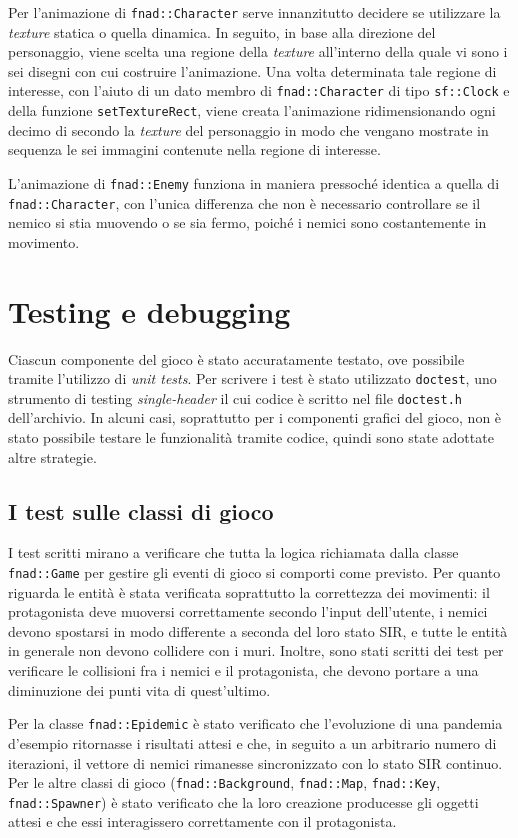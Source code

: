 \documentclass{article}
\begin{document}
Per l'animazione di \verb|fnad::Character| serve innanzitutto decidere se utilizzare la \textit{texture} statica o quella dinamica. In seguito, in base alla direzione del personaggio, viene scelta una regione della \textit{texture} all'interno della quale vi sono i sei disegni con cui costruire l'animazione. Una volta determinata tale regione di interesse, con l'aiuto di un dato membro di \verb|fnad::Character| di tipo \verb|sf::Clock| e della funzione \verb|setTextureRect|, viene creata l'animazione ridimensionando ogni decimo di secondo la \textit{texture} del personaggio in modo che vengano mostrate in sequenza le sei immagini contenute nella regione di interesse.

L'animazione di \verb|fnad::Enemy| funziona in maniera pressoché identica a quella di \verb|fnad::Character|, con l'unica differenza che non è necessario controllare se il nemico si stia muovendo o se sia fermo, poiché i nemici sono costantemente in movimento.

\section{Testing e debugging}
Ciascun componente del gioco è stato accuratamente testato, ove possibile tramite l'utilizzo di \textit{unit tests}. Per scrivere i test è stato utilizzato \verb|doctest|, uno strumento di testing \textit{single-header} il cui codice è scritto nel file \verb|doctest.h| dell'archivio. In alcuni casi, soprattutto per i componenti grafici del gioco, non è stato possibile testare le funzionalità tramite codice, quindi sono state adottate altre strategie.

\subsection{I test sulle classi di gioco}
I test scritti mirano a verificare che tutta la logica richiamata dalla classe \verb|fnad::Game| per gestire gli eventi di gioco si comporti come previsto. Per quanto riguarda le entità è stata verificata soprattutto la correttezza dei movimenti: il protagonista deve muoversi correttamente secondo l'input dell'utente, i nemici devono spostarsi in modo differente a seconda del loro stato SIR, e tutte le entità in generale non devono collidere con i muri. Inoltre, sono stati scritti dei test per verificare le collisioni fra i nemici e il protagonista, che devono portare a una diminuzione dei punti vita di quest'ultimo.

Per la classe \verb|fnad::Epidemic| è stato verificato che l'evoluzione di una pandemia d'esempio ritornasse i risultati attesi e che, in seguito a un arbitrario numero di iterazioni, il vettore di nemici rimanesse sincronizzato con lo stato SIR continuo. Per le altre classi di gioco (\verb|fnad::Background|, \verb|fnad::Map|, \verb|fnad::Key|, \verb|fnad::Spawner|) è stato verificato che la loro creazione producesse gli oggetti attesi e che essi interagissero correttamente con il protagonista.
\end{document}

